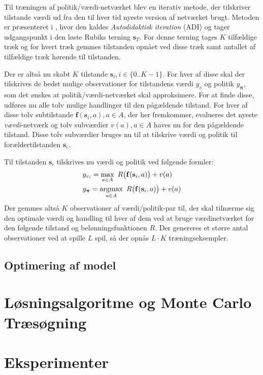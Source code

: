 \documentclass[../main.tex]{subfiles}
\begin{document}
Til træningen af politik/værdi-netværket blev en iterativ metode, der tilskriver tilstande værdi ud fra den til hver tid nyeste version af netværket brugt. 
Metoden er præsenteret i \cite[4.1]{HumansBeGone}, hvor den kaldes \textit{Autodidaktisk iteration} (ADI) og tager udgangspunkt i den løste Rubiks terning \(\mathbf s_T\).
For denne terning tages \(K\) tilfældige træk og for hvert træk gemmes tilstanden opnået ved disse træk samt antallet af tilfældige træk hørende til tilstanden. 

Der er altså nu skabt \(K\) tilstande \(\mathbf{s}_{i}, i\in\{0..K-1\}\). For hver af disse skal der tilskrives de bedst mulige observationer for tilstandens værdi \(y_v\) og politik \(y_{\bm \pi }\), som det ønskes at politik/værdi-netværket skal approksimere.
For at finde disse, udføres nu alle tolv mulige handlinger til den pågældende tilstand. For hver af disse tolv subtilstande \(\mathbf f(\mathbf s_i, a), a\in A\), der her fremkommer, evalueres det nyeste \textit{værdi}-netværk og tolv subværdier \(v(a), a\in A\) haves nu for den pågældende tilstand.
Disse tolv subværdier bruges nu til at tilskrive værdi og politik til forældertilstanden \(\mathbf s _i\).	 

Til tilstanden \(\mathbf s _i\) tilskrives nu værdi og politik ved følgende formler:
\begin{align}
	&y_{v_i}= \operatorname*{max}_{a\in A}\  R\big(\mathbf f(\mathbf s_i, a)\big)+v(a)\label{eq:targetval}
	\\
	& y_{\bm \pi } = \operatorname*{argmax}_{a\in A} \  R\big(\mathbf f(\mathbf s_i, a)\big)+v(a) \label{eq:targetpi}
\end{align}
Der gemmes altså \(K\) observationer af værdi/politik-par til, der skal tilnærme sig den optimale værdi og handling til hver af dem ved at bruge værdinetværket for den følgende tilstand og belønningsfunktionen \(R\). 
Der genereres et større antal observationer ved at spille \(L\) spil, så der opnås \(L\cdot K\) træningseksempler. 


\subsection*{Optimering af model}




\section{Løsningsalgoritme og Monte Carlo Træsøgning}

\section{Eksperimenter}
\end{document}
